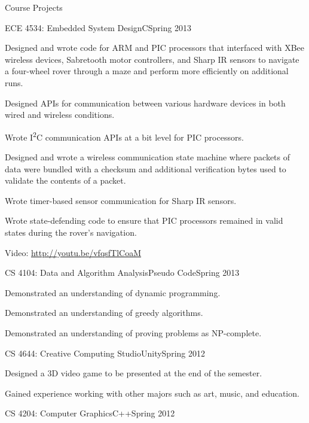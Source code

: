 \documentclass[10pt,a4paper]{article}
\begin{document}
    {Course Projects} {
     \begin{resumeinfo}{ECE 4534: Embedded System Design}{C}{Spring 2013}
         \item Designed and wrote code for ARM and PIC processors that interfaced with XBee
               wireless devices, Sabretooth motor controllers, and Sharp IR sensors to navigate
               a four-wheel rover through a maze and perform more efficiently on additional runs.
         \item Designed APIs for communication between various hardware devices in both wired
               and wireless conditions.
         \item Wrote I\textsuperscript{2}C communication APIs at a bit level for PIC processors.
         \item Designed and wrote a wireless communication state machine where packets of data
               were bundled with a checksum and additional verification bytes used to validate
               the contents of a packet.
         \item Wrote timer-based sensor communication for Sharp IR sensors.
         \item Wrote state-defending code to ensure that PIC processors remained in valid states
               during the rover's navigation.
         \item Video: \url{http://youtu.be/vfqsfTlCoaM}
     \end{resumeinfo}
     \addvspace{1em}
     \begin{resumeinfo}{CS 4104: Data and Algorithm Analysis}{Pseudo Code}{Spring 2013}
         \item Demonstrated an understanding of dynamic programming.
         \item Demonstrated an understanding of greedy algorithms.
         \item Demonstrated an understanding of proving problems as NP-complete.
     \end{resumeinfo}
     \addvspace{1em}
     \begin{resumeinfo}{CS 4644: Creative Computing Studio}{Unity}{Spring 2012}
         \item Designed a 3D video game to be presented at the end of the semester.
         \item Gained experience working with other majors such as art, music, and education.
     \end{resumeinfo}
     \addvspace{1em}
     \begin{resumeinfo}{CS 4204: Computer Graphics}{C++}{Spring 2012}

\end{resumeinfo}}
\end{document}
